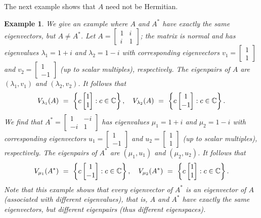 \documentclass{article}
\newtheorem{exa}{Example}
\begin{document}
The next example shows that $A$ need not be Hermitian.

\begin{exa}\label{Exa:4notHer}
\rm We give an example where $A$ and $A^*$ have exactly  the same eigenvectors, but $A\not =A^*$. Let $A=\begin{bmatrix} 1 & i \\i & 1\end{bmatrix}$; the matrix is normal and
 has eigenvalues $\lambda_1 =1+i$ and $\lambda_2 =1-i$ with
corresponding eigenvectors $v_1=\begin{bmatrix}  1 \\ 1 \end{bmatrix}$ and
$v_2=\begin{bmatrix}  1 \\ -1 \end{bmatrix}$ (up to scalar multiples), respectively. The eigenpairs of $A$ are
$(\lambda_1, v_1)$ and $(\lambda_2, v_2)$. It follows that
$$V_{\lambda_1}(A) \ = \ \left \{ c\begin{bmatrix} 1 \\ 1\end{bmatrix} :c\in \Bbb C\right  \}, \quad
V_{\lambda_2}(A) \  = \  \left  \{ c\begin{bmatrix} 1 \\ -1 \end{bmatrix} :c\in \Bbb C\right \}.$$ We find that $A^*=\begin{bmatrix} 1 & -i \\-i & 1\end{bmatrix}$  has eigenvalues  $\mu_1 =1+i$ and $\mu_2 =1-i$ with
corresponding eigenvectors $u_1=\begin{bmatrix}  1 \\ -1 \end{bmatrix}$ and
$u_2=\begin{bmatrix}  1 \\ 1 \end{bmatrix}$ (up to scalar multiples), respectively.
The eigenpairs of $A^*$ are
$(\mu_1, u_1)$ and $(\mu_2, u_2)$.  It follows that
$$V_{\mu_1}(A^*) \ = \ \left \{ c\begin{bmatrix} 1 \\ -1\end{bmatrix} :c\in \Bbb C\right  \}, \quad
V_{\mu_2}(A^*) \ = \ \left  \{ c\begin{bmatrix} 1 \\ 1\end{bmatrix} : c\in \Bbb C\right \}.$$
Note that  this example shows that  every eigenvector of $A^*$ is an eigenvector of $A$ (associated with different eigenvalues), that is, $A$ and $A^*$ have exactly the same eigenvectors, but different eigenpairs (thus different eigenspaces).
\end{exa}
\end{document}
